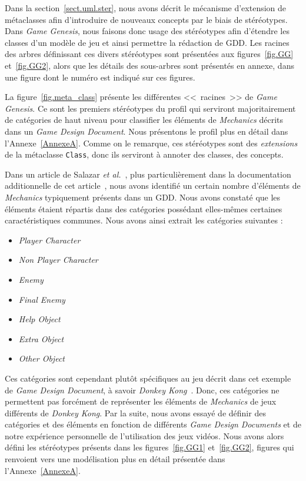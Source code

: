 Dans la section~\ref{sect.uml.ster}, nous avons décrit le mécanisme d'extension de m\'etaclasses afin d'introduire de nouveaux concepts par le biais de stéréotypes. 
Dans \emph{Game Genesis}, nous faisons donc usage des stéréotypes afin d'étendre les classes d'un modèle de jeu et ainsi permettre la rédaction de GDD.
%
Les racines des arbres définissant ces divers stéréotypes sont
présentées aux figures~\ref{fig.GG} et~\ref{fig.GG2}, alors que les
détails des sous-arbres sont présentés en annexe, dans une figure
dont le numéro est indiqué sur ces figures.

La figure~\ref{fig.meta_class} présente les différentes <<~racines~>> de \emph{Game Genesis}. 
Ce sont les premiers stéréotypes du profil qui serviront majoritairement de catégories de haut niveau pour classifier les éléments de \emph{Mechanics} décrits dans un \emph{Game Design Document}.
Nous présentons le profil plus en détail dans l'Annexe~\ref{AnnexeA}.
%
Comme on le remarque, ces stéréotypes sont des \emph{extensions} de la
métaclasse \texttt{Class}, donc ils serviront à annoter des classes, des concepts.


Dans un article de Salazar \emph{et al.}~\cite{GDD_software}, plus particulièrement dans la documentation additionnelle de cet article~\cite{salazar_gdd}, nous avons identifié un certain nombre d'\'el\'ements de \emph{Mechanics} typiquement présents dans un GDD.
Nous avons constaté que les éléments étaient répartis dans des catégories possédant elles-mêmes certaines caractéristiques communes. 
Nous avons ainsi extrait les catégories suivantes :

\begin{itemize}
    \item \emph{Player Character}
    \item \emph{Non Player Character}
    \item \emph{Enemy}
    \item \emph{Final Enemy}
    \item \emph{Help Object}
    \item \emph{Extra Object}
    \item \emph{Other Object}
\end{itemize}



Ces catégories sont cependant plutôt spécifiques au jeu décrit dans cet exemple de \emph{Game Design Document}, à savoir \emph{Donkey Kong}~\cite{salazar_gdd}.
Donc, ces catégories ne permettent pas forcément de représenter les éléments de \emph{Mechanics} de jeux différents de \emph{Donkey Kong}.
Par la suite, nous avons essayé de définir des catégories et des éléments en fonction de différents \emph{Game Design Documents} et de notre expérience personnelle de l'utilisation des jeux vidéos.
Nous avons alors défini les stéréotypes présents dans les figures~\ref{fig.GG1} et~\ref{fig.GG2},
figures qui renvoient vers une modélisation plus en détail présentée dans l'Annexe~\ref{AnnexeA}.

